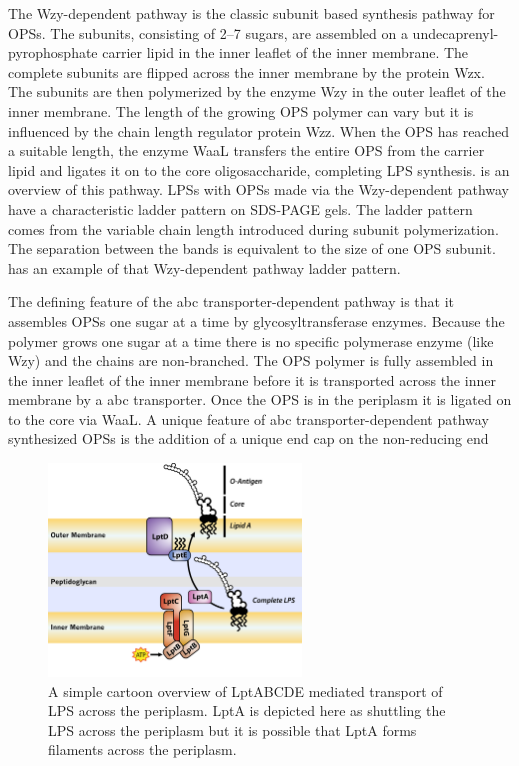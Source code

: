 The Wzy-dependent pathway is the classic subunit based synthesis pathway for \acp{OPS}. The subunits, consisting of 2--7 sugars, are assembled on a undecaprenyl-pyrophosphate
carrier lipid in the inner leaflet of the inner membrane. The complete subunits are flipped across the inner membrane by the protein Wzx. The subunits are then polymerized by the
enzyme Wzy in the outer leaflet of the inner membrane. The length of the growing \ac{OPS} polymer can vary but it is influenced by the chain length regulator protein Wzz. When the
\ac{OPS} has reached a suitable length, the enzyme WaaL transfers the entire \ac{OPS} from the carrier lipid and ligates it on to the core oligosaccharide, completing \ac{LPS}
synthesis.  is an overview of this pathway. \Acp{LPS} with
\acp{OPS} made via the Wzy-dependent pathway have a characteristic ladder pattern on
\ac{SDS-PAGE} gels. The ladder pattern comes from the variable chain length introduced during subunit polymerization. The separation between the bands is equivalent to the size
of one \ac{OPS} subunit.  has an example of that
Wzy-dependent pathway ladder pattern.


The defining feature of the \ac{abc} transporter-dependent pathway is that it
assembles \acp{OPS} one sugar at a time by glycosyltransferase enzymes. Because the polymer grows one sugar at a time there is no
specific polymerase enzyme (like Wzy) and the chains are non-branched. The \ac{OPS} polymer is fully assembled in the inner leaflet of the inner membrane before it is transported
across the inner membrane by a \ac{abc} transporter. Once the \ac{OPS} is in the periplasm it is ligated on to the core via WaaL. A unique feature of \ac{abc} transporter-dependent
pathway synthesized \acp{OPS} is the addition of a unique end cap on the non-reducing end

\begin{figure}[htb]
  	\begin{center}
   		\includegraphics[width=0.6\textwidth]{intro/img/lpstransport.pdf}
   	\end{center}
   	\caption[A simple overview of \ac{LPS} transport across the periplasm]{ A simple cartoon overview of LptABCDE mediated transport of \ac{LPS} across the periplasm. LptA is
depicted here as shuttling the \ac{LPS} across the periplasm but it is possible that LptA forms filaments across the periplasm.}
\label{fig:lpstransport}
\end{figure}

